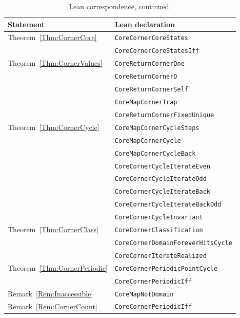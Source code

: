 \documentclass[11pt,letterpaper]{article}
\begin{document}
\begin{table}[htbp]
\centering
\begin{tabular}{ll}
\toprule
Statement & Lean declaration \\
\midrule
Theorem~\ref{Thm:CornerCore} & \texttt{CoreCornerCoreStates} \\
 & \texttt{CoreCornerCoreStatesIff} \\
Theorem~\ref{Thm:CornerValues} & \texttt{CoreReturnCornerOne} \\
 & \texttt{CoreReturnCornerD} \\
 & \texttt{CoreReturnCornerSelf} \\
 & \texttt{CoreMapCornerTrap} \\
 & \texttt{CoreReturnCornerFixedUnique} \\
Theorem~\ref{Thm:CornerCycle} & \texttt{CoreMapCornerCycleSteps} \\
 & \texttt{CoreMapCornerCycle} \\
 & \texttt{CoreMapCornerCycleBack} \\
 & \texttt{CoreCornerCycleIterateEven} \\
 & \texttt{CoreCornerCycleIterateOdd} \\
 & \texttt{CoreCornerCycleIterateBack} \\
 & \texttt{CoreCornerCycleIterateBackOdd} \\
 & \texttt{CoreCornerCycleInvariant} \\
Theorem~\ref{Thm:CornerClass} & \texttt{CoreCornerClassification} \\
 & \texttt{CoreCornerDomainForeverHitsCycle} \\
 & \texttt{CoreCornerIterateRealized} \\
Theorem~\ref{Thm:CornerPeriodic} & \texttt{CoreCornerPeriodicPointCycle} \\
 & \texttt{CoreCornerPeriodicIff} \\
Remark~\ref{Rem:Inaccessible} & \texttt{CoreMapNotDomain} \\
Remark~\ref{Rem:CornerCount} & \texttt{CoreCornerPeriodicIff} \\
\bottomrule
\end{tabular}
\caption{Lean correspondence, continued.}
\end{table}
\end{document}
